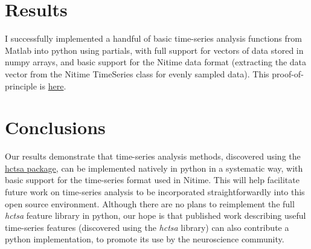 \documentclass[twocolumn]{bmcart}%
\begin{document}
\section{Results}\label{results}

I successfully implemented a handful of basic time-series analysis
functions from Matlab into python using partials, with full support for
vectors of data stored in numpy arrays, and basic support for the Nitime
data format (extracting the data vector from the Nitime TimeSeries class
for evenly sampled data). This proof-of-principle is
\href{https://github.com/benfulcher/hctsa_python}{here}.

\section{Conclusions}\label{conclusions}

Our results demonstrate that time-series analysis methods, discovered
using the \href{https://github.com/benfulcher/hctsa}{hctsa package}, can
be implemented natively in python in a systematic way, with basic
support for the time-series format used in Nitime. This will help
facilitate future work on time-series analysis to be incorporated
straightforwardly into this open source environment. Although there are
no plans to reimplement the full \emph{hctsa} feature library in python,
our hope is that published work describing useful time-series features
(discovered using the \emph{hctsa} library) can also contribute a python
implementation, to promote its use by the neuroscience community.

\end{document}
